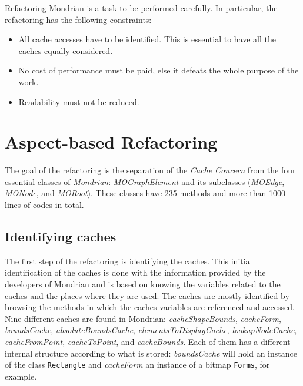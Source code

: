 \documentclass[preprint,10pt]{sigplanconf}
\newcommand{\ct}{\lstinline[backgroundcolor=\color{white},basicstyle=\footnotesize\ttfamily]}
\newcommand{\seclabel}[1]{\label{sec:#1}}
\begin{document}
Refactoring Mondrian is a task to be performed carefully. In particular, the refactoring has the following constraints:

\begin{itemize}
\item All cache accesses have to be identified. This is essential to have all the caches equally considered. 
\item No cost of performance must be paid, else it defeats the whole purpose of the work.
\item Readability must not be reduced.
\end{itemize}

\section{Aspect-based Refactoring}\seclabel{refactoring}


The goal of the refactoring is the separation of the \emph{Cache
Concern} from the four essential classes of \emph{Mondrian}: \emph{MOGraphElement}
and its subclasses (\emph{MOEdge}, \emph{MONode}, and \emph{MORoot}). These classes have 235 methods and more than 1000 lines of codes in total.

\subsection{Identifying caches}
The first step of the refactoring is identifying the caches.
This initial identification of the caches is done with the information
provided by the developers of Mondrian and is based on knowing the
variables related to the caches and the places where they are used. The caches are mostly identified by browsing the methods in which the caches variables are referenced and accessed.
Nine different caches are found in Mondrian: \emph{cacheShapeBounds},
\emph{cacheForm}, \emph{boundsCache}, \emph{absoluteBoundsCache},
\emph{elementsToDisplayCache}, \emph{lookupNodeCache}, \emph{cacheFromPoint},
\emph{cacheToPoint}, and \emph{cacheBounds}. Each of them has a different
internal structure according to what is stored: \emph{boundsCache} will hold an instance of the class \ct{Rectangle} and \emph{cacheForm} an instance of a bitmap \ct{Forms}, for example.
\end{document}
